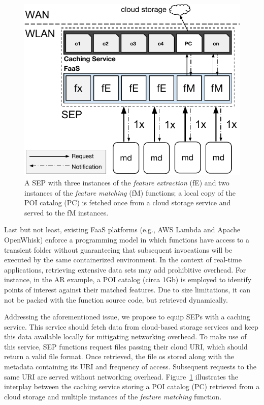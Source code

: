 \documentclass[letterpaper, 10 pt, conference]{ieeeconf}  %
\begin{document}
\begin{figure}[tbp]
	\centering
	\includegraphics[width=\linewidth]{Figs/Mobile_Computation_Offloading_Caching.pdf}
	\caption{A SEP with three instances of the \textit{feature extraction} (fE) and two instances of the \textit{feature matching} (fM) functions; a local copy of the POI catalog (PC) is fetched once from a cloud storage service and served to the fM instances.} 
	\label{fig:Mobile_Computation_Offloading_Caching}
\end{figure}

Last but not least, existing FaaS platforms (e.g., AWS Lambda and Apache OpenWhisk) enforce a programming model in which functions have access to a transient folder without guaranteeing that subsequent invocations will be executed by the same containerized environment. %
In the context of real-time applications, retrieving extensive data sets may add prohibitive overhead. For instance, in the AR example, a POI catalog (circa 1Gb) is employed to identify points of interest against their matched features. Due to size limitations, it can not be packed with the function source code, but retrieved dynamically.

Addressing the aforementioned issue, we propose to equip SEPs with a caching service. This service should fetch data from cloud-based storage services and keep this data available locally for mitigating networking overhead. 
To make use of this service, SEP functions request files passing their cloud URI, which should return a valid file format.
Once retrieved, the file os stored along with the metadata containing its URI and frequency of access. Subsequent requests to the same URI are served without networking overhead. Figure~\ref{fig:Mobile_Computation_Offloading_Caching} illustrates the interplay between the caching service storing a POI catalog (PC) retrieved from a cloud storage and multiple instances of the \textit{feature matching} function.
\end{document}

